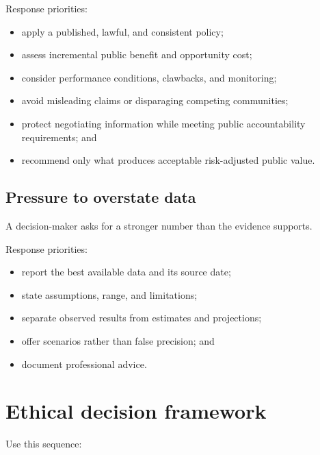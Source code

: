 \documentclass[11pt,letterpaper,oneside,openany]{book}
\begin{document}
Response priorities:


\begin{itemize}
\item apply a published, lawful, and consistent policy;
\item assess incremental public benefit and opportunity cost;
\item consider performance conditions, clawbacks, and monitoring;
\item avoid misleading claims or disparaging competing communities;
\item protect negotiating information while meeting public accountability requirements; and
\item recommend only what produces acceptable risk-adjusted public value.
\end{itemize}


\subsection[Pressure to overstate data]{Pressure to overstate data}
A decision-maker asks for a stronger number than the evidence supports.


Response priorities:


\begin{itemize}
\item report the best available data and its source date;
\item state assumptions, range, and limitations;
\item separate observed results from estimates and projections;
\item offer scenarios rather than false precision; and
\item document professional advice.
\end{itemize}


\section[Ethical decision framework]{Ethical decision framework}
Use this sequence:
\end{document}

